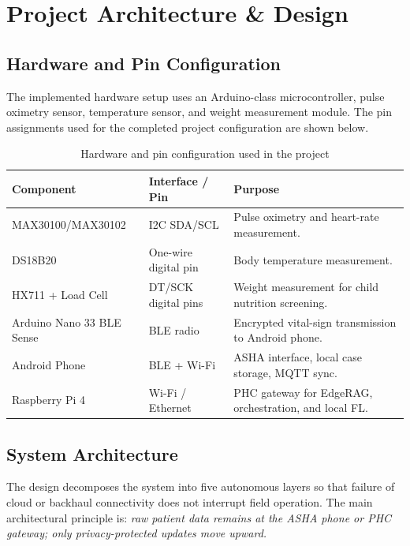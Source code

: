 \documentclass[12pt,a4paper,openany]{report}
\begin{document}
\chapter{Project Architecture \& Design}

\section{Hardware and Pin Configuration}
The implemented hardware setup uses an Arduino-class microcontroller, pulse oximetry sensor, temperature sensor, and weight measurement module. The pin assignments used for the completed project configuration are shown below.

\begin{table}[!htbp]
\centering
\caption{Hardware and pin configuration used in the project}
\begin{tabularx}{\textwidth}{p{}p{}X}
\toprule
\textbf{Component} & \textbf{Interface / Pin} & \textbf{Purpose}\\
\midrule
MAX30100/MAX30102 & I2C SDA/SCL & Pulse oximetry and heart-rate measurement.\\
DS18B20 & One-wire digital pin & Body temperature measurement.\\
HX711 + Load Cell & DT/SCK digital pins & Weight measurement for child nutrition screening.\\
Arduino Nano 33 BLE Sense & BLE radio & Encrypted vital-sign transmission to Android phone.\\
Android Phone & BLE + Wi-Fi & ASHA interface, local case storage, MQTT sync.\\
Raspberry Pi 4 & Wi-Fi / Ethernet & PHC gateway for EdgeRAG, orchestration, and local FL.\\
\bottomrule
\end{tabularx}
\end{table}

\section{System Architecture}
The design decomposes the system into five autonomous layers so that failure of cloud or backhaul connectivity does not interrupt field operation. The main architectural principle is: \textit{raw patient data remains at the ASHA phone or PHC gateway; only privacy-protected updates move upward.}
\end{document}
